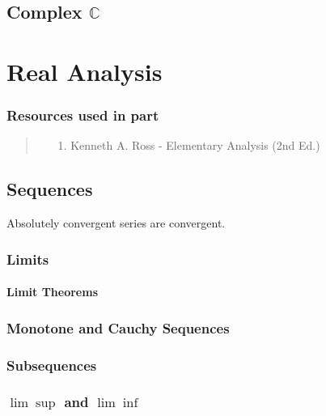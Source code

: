 \documentclass[12pt, english]{book}
\newenvironment{partintro}
{\vspace*{\fill}
	\section*{\centering Resources used in part \thepart}
	\begin{quotation}}
	{\end{quotation}\vspace*{\fill}\newpage}
\begin{document}
	\chapter{Complex $\mathbb{C}$} \label{Complex Chapter - Numbers}
	

	
	\part{Real Analysis} \label{Real Analysis Part}
	\begin{partintro}
		\begin{itemize}
			\item[1.] Kenneth A. Ross - Elementary Analysis (2nd Ed.) \cite{Ross.K-Elementary-Analysis-2013}
		\end{itemize}
	\end{partintro}

	\chapter{Sequences} \label{Sequences Chapter - Real Analysis}
	
	\begin{corollary}
		\label{Absolute convergence implies convergence Corollary - Real}
		Absolutely convergent series are convergent.
	\end{corollary}
	
	\section{Limits} \label{Limits Section - Real Analysis}
	
	\subsection{Limit Theorems} \label{Limit Theorems Subsection - Real Analysis}
	
	\section{Monotone and Cauchy Sequences} \label{Monotone and Cauchy Sequences Section - Real Analysis}
	
	\section{Subsequences} \label{Subsequences Section - Real Analysis}
	
	\section{$\lim \operatorname{sup}$ and $\lim \operatorname{inf}$} \label{lim sup and lim inf Section - Real Analysis}
	
\end{document}
